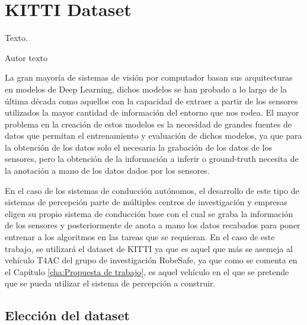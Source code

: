 \chapter{KITTI Dataset}
\label{cha:KITTI Dataset}

\begin{FraseCelebre}
  \begin{Frase}
    Texto.
  \end{Frase}
  \begin{Fuente}
    Autor texto
  \end{Fuente}
\end{FraseCelebre}

\noindent
La gran mayoría de sistemas de visión por computador basan sus arquitecturas en modelos de Deep Learning, dichos modelos se han probado a lo largo de la última década como aquellos con la capacidad de extraer a partir de los sensores utilizados la mayor cantidad de información del entorno que nos rodea. El mayor problema en la creación de estos modelos es la necesidad de grandes fuentes de datos que permitan el entrenamiento y evaluación de dichos modelos, ya que para la obtención de los datos solo el necesaria la grabación de los datos de los sensores, pero la obtención de la información a inferir o ground-truth necesita de la anotación a mano de los datos dados por los sensores.

En el caso de los sistemas de conducción autónomos, el desarrollo de este tipo de sistemas de percepción parte de múltiples centros de investigación y empresas eligen su propio sistema de conducción base con el cual se graba la información de los sensores y posteriormente de anota a mano los datos recabados para poner entrenar a los algoritmos en las tareas que se requieran. En el caso de este trabajo, se utilizará el dataset de KITTI ya que es aquel que más se asemeja al vehículo \ac{T4AC} del grupo de investigación RobeSafe, ya que como se comenta en el Capítulo \ref{cha:Propuesta de trabajo}, es aquel vehículo en el que se pretende que se pueda utilizar el sistema de percepción a construir.

\section{Elección del dataset}
\label{sec:Elección del dataset}

